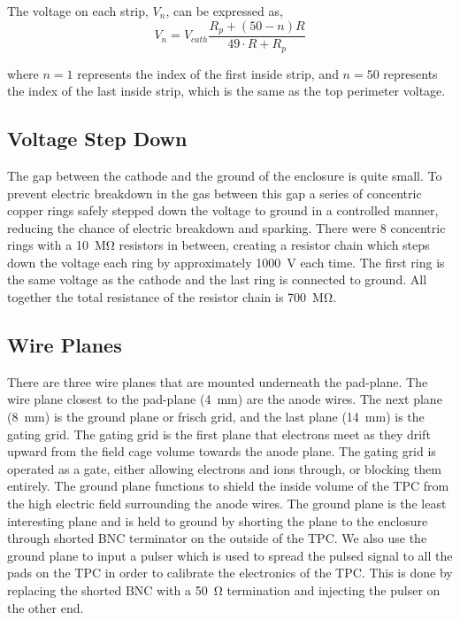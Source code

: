 The voltage on each strip, $V_n$, can be expressed as, 
\begin{equation}
V_n = V_{cath} \frac{R_p + (50 - n)R}{49\cdot R + R_p}
\label{eq:FCstrip}
\end{equation}

where $n = 1$ represents the index of the first inside strip, and $n= 50$ represents the index of the last inside strip, which is the same as the top perimeter voltage.



\subsection{Voltage Step Down}
The gap between the cathode and the ground of the enclosure is quite small. To prevent electric breakdown in the gas between this gap a series of concentric copper rings safely stepped down the voltage to ground in a controlled manner, reducing the chance of electric breakdown and sparking. There were 8 concentric rings with a \SI{10}{\mega\ohm} resistors in between, creating a resistor chain which steps down the voltage each ring by approximately \SI{1000}{\volt} each time. The first ring is the same voltage as the cathode and the last ring is connected to ground. All together the total resistance of the resistor chain is \SI{700}{\mega\ohm}.


\subsection{Wire Planes}

There are three wire planes that are mounted underneath the pad-plane. The wire plane closest to the pad-plane (\SI{4}{\milli\metre}) are the anode wires. The next plane (\SI{8}{\milli\metre}) is the ground plane or frisch grid, and the last plane (\SI{14}{\milli\metre}) is the gating grid. The gating grid is the first plane that electrons meet as they drift upward from the field cage volume towards the anode plane. The gating grid is operated as a gate, either allowing electrons and ions through, or blocking them entirely. The ground plane functions to shield the inside volume of the TPC from the high electric field surrounding the anode wires. The ground plane is the least interesting plane and is held to ground by shorting the plane to the enclosure through  shorted BNC terminator on the outside of the TPC. We also use the ground plane to input a pulser which is used to spread the pulsed signal to all the pads on the TPC in order to calibrate the electronics of the TPC. This is done by replacing the shorted BNC with a \SI{50}{\ohm} termination and injecting the pulser on the other end. 


